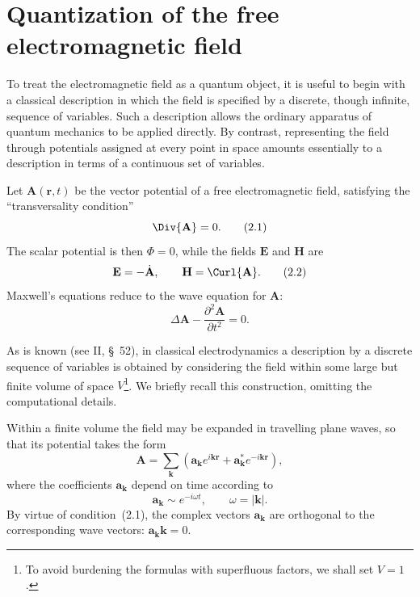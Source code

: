 \section{Quantization of the free electromagnetic field}

To treat the electromagnetic field as a quantum object, it is useful to begin with a classical description in which the field is specified by a discrete, though infinite, sequence of variables. Such a description allows the ordinary apparatus of quantum mechanics to be applied directly. By contrast, representing the field through potentials assigned at every point in space amounts essentially to a description in terms of a continuous set of variables.

Let $\mathbf{A}(\mathbf{r},t)$ be the vector potential of a free electromagnetic field, satisfying the ``transversality condition''
\begin{equation}
\Div{\mathbf{A}}=0.
\tag{2.1}
\end{equation}
The scalar potential is then $\Phi=0$, while the fields $\mathbf{E}$ and $\mathbf{H}$ are
\begin{equation}
\mathbf{E}=-\dot{\mathbf{A}},\qquad \mathbf{H}=\Curl{\mathbf{A}}.
\tag{2.2}
\end{equation}
Maxwell's equations reduce to the wave equation for $\mathbf{A}$:
\begin{equation}
\Delta\mathbf{A}-\frac{\partial^2\mathbf{A}}{\partial t^2}=0.
\tag{2.3}
\end{equation}

As is known (see II, \S~52), in classical electrodynamics a description by a discrete sequence of variables is obtained by considering the field within some large but finite volume of space $V$\footnote{To avoid burdening the formulas with superfluous factors, we shall set $V=1$.}. We briefly recall this construction, omitting the computational details.

Within a finite volume the field may be expanded in travelling plane waves, so that its potential takes the form
\begin{equation}
\mathbf{A}=\sum_{\mathbf{k}}\left(\mathbf{a}_{\mathbf{k}}e^{i\mathbf{kr}}+\mathbf{a}_{\mathbf{k}}^*e^{-i\mathbf{kr}}\right),
\tag{2.4}
\end{equation}
where the coefficients $\mathbf{a}_{\mathbf{k}}$ depend on time according to
\begin{equation}
\mathbf{a}_{\mathbf{k}}\sim e^{-i\omega t},\qquad \omega=|\mathbf{k}|.
\tag{2.5}
\end{equation}
By virtue of condition~(2.1), the complex vectors $\mathbf{a}_{\mathbf{k}}$ are orthogonal to the corresponding wave vectors: $\mathbf{a}_{\mathbf{k}}\mathbf{k}=0$.

